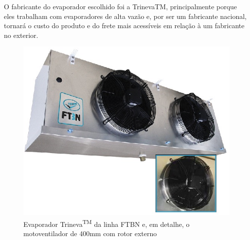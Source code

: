 O fabricante do evaporador escolhido foi a TrinevaTM, principalmente porque eles trabalham com evaporadores de alta vazão e, por ser um fabricante nacional, tornará o custo do produto e do frete mais acessíveis em relação à um fabricante no exterior. 

\begin{figure}[!htbp]
	 \centering
	  \includegraphics[scale=1]{editaveis/figuras/evaporador_trivena}
	  \caption[Evaporador trivena]{Evaporador Trineva\textsuperscript{TM} da linha FTBN e, em detalhe, o motoventilador de 400mm com rotor externo \footnotemark}
	  \label{evaporador}
	\end{figure}	   
	\FloatBarrier
	

